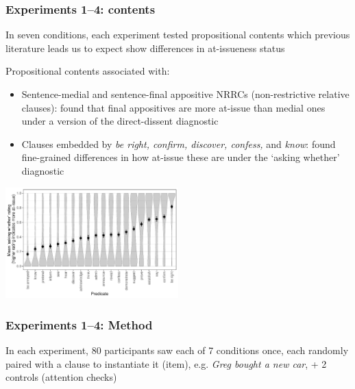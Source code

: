 \documentclass[compress, xcolor = dvipsnames, aspectratio=169, handout]{beamer}
\begin{document}
	\begin{frame}[t]\frametitle{Experiments 1–4: contents}\scriptsize
		In seven conditions, each experiment tested propositional contents which previous literature leads us to expect show differences in at-issueness status\medskip\\ \pause

		Propositional contents associated with:\smallskip
		\begin{itemize}
			\item Sentence-medial and sentence-final appositive NRRCs (non-restrictive relative clauses): \citet{syrett_experimental_2015} found that final appositives are more at-issue than medial ones under a version of the direct-dissent diagnostic\smallskip\pause

			\item Clauses embedded by \emph{be right, confirm, discover, confess,} and \emph{know}:
			\citet{degen-tonhauser-glossa} found fine-grained differences in how at-issue these are under the `asking whether' diagnostic\smallskip\pause
		\end{itemize}

		\begin{center}
			\includegraphics[width=0.5\textwidth]{../../results/degen-tonhauser-glossa/graphs/mean-asking-whether-ratings.pdf}
		\end{center}
		
	\end{frame}

	\begin{frame}\frametitle{Experiments 1–4: Method}
		In each experiment, 80 participants saw each of 7 conditions once, each randomly paired with a clause to instantiate it (item), e.g. \emph{Greg bought a new car}, + 2 controls (attention checks)
	
	
	\end{frame}
\end{document}
